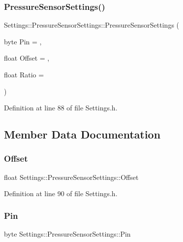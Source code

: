 \subsubsection{\texorpdfstring{Pressure\+Sensor\+Settings()}{PressureSensorSettings()}\hspace{0.1cm}{\footnotesize\ttfamily [2/2]}}
{\footnotesize\ttfamily Settings\+::\+Pressure\+Sensor\+Settings\+::\+Pressure\+Sensor\+Settings (\begin{DoxyParamCaption}\item[{byte}]{Pin = {},  }\item[{float}]{Offset = {},  }\item[{float}]{Ratio = {} }\end{DoxyParamCaption})\hspace{0.3cm}{\ttfamily [inline]}}



Definition at line 88 of file Settings.\+h.



\subsection{Member Data Documentation}
\mbox{\label{struct_settings_1_1_pressure_sensor_settings_a3f9d1ad6b96c4509b75c579804e3839d}} 
\subsubsection{\texorpdfstring{Offset}{Offset}}
{\footnotesize\ttfamily float Settings\+::\+Pressure\+Sensor\+Settings\+::\+Offset}



Definition at line 90 of file Settings.\+h.

\mbox{\label{struct_settings_1_1_pressure_sensor_settings_aba6b47901fe5400f422027a80dc34f48}} 
\subsubsection{\texorpdfstring{Pin}{Pin}}
{\footnotesize\ttfamily byte Settings\+::\+Pressure\+Sensor\+Settings\+::\+Pin}



